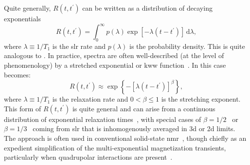 Quite generally, $R \left (t, t^{\prime} \right )$ can be written as a distribution of decaying exponentials
\begin{equation} \label{eq:slr-integral}
   R \left (t, t^{\prime} \right ) = \int_{0}^{\infty} p ( \lambda ) \exp \left [-  \lambda \left ( t - t^{\prime} \right ) \right ] \, \mathrm{d} \lambda ,
\end{equation}
where $\lambda \equiv 1 / T_{1}$ is the \gls{slr} rate and $p ( \lambda )$ is the probability density.
This is quite analogous to .
In practice, spectra are often well-described (at the level of phenomenology) by a stretched exponential or \gls{kww} function~\cite{1854-Kohlrausch-AP-167-179, 1970-Williams-TFS-66-80, 1980-Lindsay-JCP-73-3348, 2006-Johnston-PRB-74-184430, 2016-Wu-SR-6-20506}.
In this case  becomes:
\begin{equation} \label{eq:slr-stretched}
   R \left ( t, t^{\prime} \right ) \approx \exp \left \{ - \left  [ \lambda \left ( t-t^{\prime} \right ) \right ]^{\beta} \right \},
\end{equation}
where $\lambda \equiv 1/T_{1}$ is the relaxation rate and $0 < \beta \leq 1$ is the stretching exponent.
This form of $R \left ( t, t^{\prime} \right )$ is quite general and can arise from a continuous distribution of exponential relaxation times~\cite{2006-Johnston-PRB-74-184430}, with special cases of $\beta = 1/2$~\cite{1968-Tse-PRL-21-511, 1984-Stockmann-JNCS-66-501} or $\beta = 1/3$~\cite{1992-Bader-JPCM-4-4779} coming from \gls{slr} that is inhomogenously averaged in \gls{3d} or \gls{2d} limits.
The approach is often used in conventional solid-state \gls{nmr}~\cite{1995-Narayanan-JMRSA-112-58}, though chiefly as an expedient simplification of the multi-exponential magnetization transients, particularly when quadrupolar interactions are present~\cite{1995-McDowell-JMRSA-113-242}.


